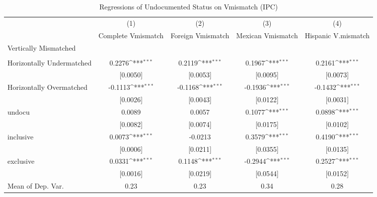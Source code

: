 \begin{table}[htbp]\centering
\def\sym#1{\ifmmode^{#1}\else\(^{#1}\)\fi}
\caption{Regressions of Undocumented Status on Vmismatch (IPC)}
\begin{tabular}{l*{4}{c}}
\toprule
                    &\multicolumn{1}{c}{(1)}         &\multicolumn{1}{c}{(2)}         &\multicolumn{1}{c}{(3)}         &\multicolumn{1}{c}{(4)}         \\
                    &Complete Vmismatch         &Foreign Vmismatch         &Mexican Vmismatch         &Hispanic V.mismatch         \\
\midrule
Vertically Mismatched&                     &                     &                     &                     \\
                    &                     &                     &                     &                     \\
\addlinespace
Horizontally Undermatched&      0.2276\sym{***}&      0.2119\sym{***}&      0.1967\sym{***}&      0.2161\sym{***}\\
                    &    [0.0050]         &    [0.0053]         &    [0.0095]         &    [0.0073]         \\
\addlinespace
Horizontally Overmatched&     -0.1113\sym{***}&     -0.1168\sym{***}&     -0.1936\sym{***}&     -0.1432\sym{***}\\
                    &    [0.0026]         &    [0.0043]         &    [0.0122]         &    [0.0031]         \\
\addlinespace
undocu              &      0.0089         &      0.0057         &      0.1077\sym{***}&      0.0898\sym{***}\\
                    &    [0.0082]         &    [0.0074]         &    [0.0175]         &    [0.0102]         \\
\addlinespace
inclusive           &      0.0073\sym{***}&     -0.0213         &      0.3579\sym{***}&      0.4190\sym{***}\\
                    &    [0.0006]         &    [0.0211]         &    [0.0355]         &    [0.0135]         \\
\addlinespace
exclusive           &      0.0331\sym{***}&      0.1148\sym{***}&     -0.2944\sym{***}&      0.2527\sym{***}\\
                    &    [0.0016]         &    [0.0219]         &    [0.0544]         &    [0.0152]         \\
\midrule
Mean of Dep. Var.   &        0.23         &        0.23         &        0.34         &        0.28         \\

\end{tabular}
\end{table}
